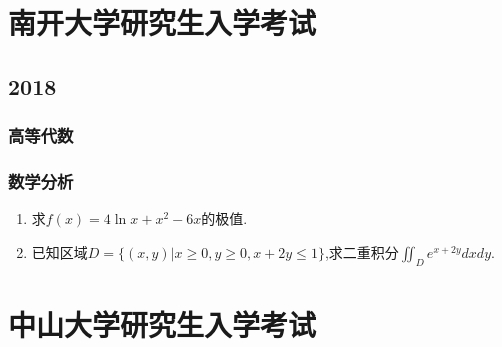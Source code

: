 \documentclass[12pt,a4paper,openany]{book}
\begin{document}
\chapter{南开大学研究生入学考试}
\section{2018}
\subsection{高等代数}
\subsection{数学分析}
\begin{enumerate}
\item 求$f(x)=4\ln{x} + x^2-6x$的极值.

\item 已知区域$D=\{(x,y)|x \ge 0, y \ge 0, x+2y \le 1\}$,求二重积分$\iint_{D}{e^{x+2y}dxdy}$.
\end{enumerate}

\chapter{中山大学研究生入学考试}
\end{document}
